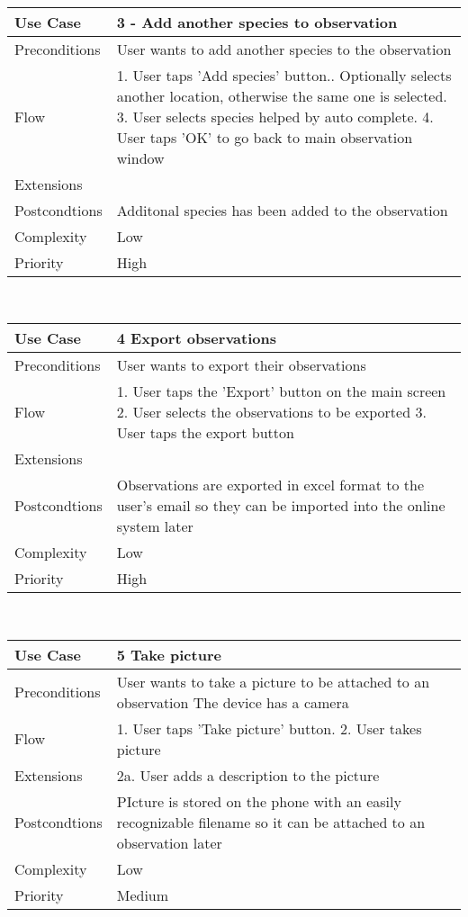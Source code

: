 \\
\begin{tabular}[t]{|l|p{}|}\hline
Use Case&3 - Add another species to observation\\\hline
Preconditions&User wants to add another species to the observation\\\hline
Flow&1. User taps 'Add species' button.\newline
2. Optionally selects another location, otherwise the same one is selected.
3. User selects species helped by auto complete.
4. User taps 'OK' to go back to main observation window \\\hline  
Extensions& \\\hline
Postcondtions&Additonal species has been added to the observation\\\hline
Complexity&Low\\\hline
Priority&High\\\hline
\end{tabular}
\\
\begin{tabular}[t]{|l|p{}|}\hline
Use Case&4  Export  observations\\\hline
Preconditions& User wants to export their observations \\\hline
Flow&1. User taps the 'Export' button on the main screen
2. User selects the observations to be exported
3. User taps the export button\\\hline
Extensions& \\\hline
Postcondtions&Observations are exported in excel format to the user's email so they can be imported into the online system later\\\hline
Complexity&Low\\\hline
Priority&High\\\hline
\end{tabular}
\\
\begin{tabular}[t]{|l|p{}|}\hline
Use Case&5 Take picture\\\hline
Preconditions&User wants to take a picture to be attached to an observation
The device has a camera\\\hline
Flow&1. User taps 'Take picture' button.
2. User takes picture \\\hline
Extensions& 2a. User adds a description to the picture\\\hline
Postcondtions&PIcture is stored on the phone with an easily recognizable filename so it can be attached to an observation later\\\hline
Complexity&Low\\\hline
Priority&Medium\\\hline
\end{tabular}
